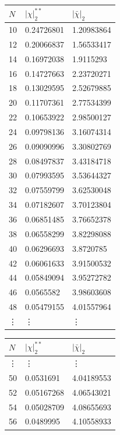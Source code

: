 \documentclass[a4paper,10pt]{article}
\begin{document}
\begin{table}[H]
\center
\begin{minipage}{0.5\textwidth} 
\center
\begin{tabular}{lll}
$N$      & $| \chi |_2^{**}$  & $|\bar{\chi} |_2$    \\
\hline
 10   & 0.24726801 & 1.20983864 \\
 12   & 0.20066837 & 1.56533417 \\
 14   & 0.16972038 & 1.9115293  \\
 16   & 0.14727663 & 2.23720271 \\
 18   & 0.13029595 & 2.52679885 \\
 20   & 0.11707361 & 2.77534399 \\
 22   & 0.10653922 & 2.98500127 \\
 24   & 0.09798136 & 3.16074314 \\
 26   & 0.09090996 & 3.30802769 \\
 28   & 0.08497837 & 3.43184718 \\
 30   & 0.07993595 & 3.53644327 \\
 32   & 0.07559799 & 3.62530048 \\
 34   & 0.07182607 & 3.70123804 \\
 36   & 0.06851485 & 3.76652378 \\
 38   & 0.06558299 & 3.82298088 \\
 40   & 0.06296693 & 3.8720785  \\
 42   & 0.06061633 & 3.91500532 \\
 44   & 0.05849094 & 3.95272782 \\
 46   & 0.0565582  & 3.98603608 \\
 48   & 0.05479155 & 4.01557964 \\
\vdots & \vdots & \vdots  \\ 
\end{tabular}
\end{minipage}%
\begin{minipage}{0.5\textwidth} 
\center
 \begin{tabular}{lll}
  $N$    & $| \chi |_2^{**}$  & $|\bar{\chi} |_2$    \\
\hline
\vdots & \vdots & \vdots  \\ 
 50   & 0.0531691  & 4.04189553 \\
 52   & 0.05167268 & 4.06543021 \\
 54   & 0.05028709 & 4.08655693 \\
 56   & 0.0489995  & 4.10558933 \\

\end{tabular}
\end{minipage}
\end{table}
\end{document}
